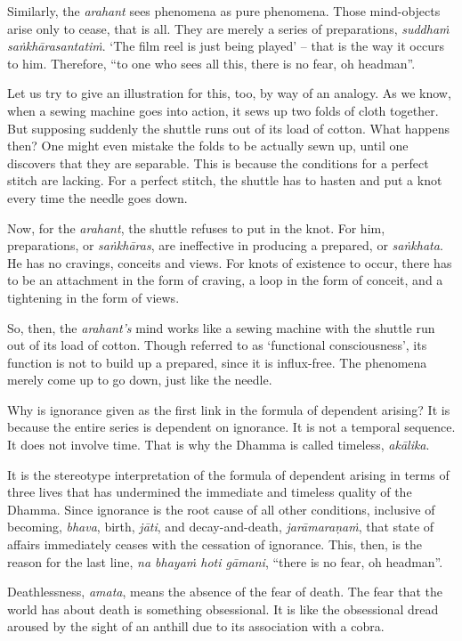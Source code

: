 Similarly, the \emph{arahant} sees phenomena as pure phenomena. Those mind-objects arise only to cease, that is all. They are merely a series of preparations, \emph{suddhaṁ saṅkhārasantatiṁ}. `The film reel is just being played' -- that is the way it occurs to him. Therefore, ``to one who sees all this, there is no fear, oh headman''.

Let us try to give an illustration for this, too, by way of an analogy. As we know, when a sewing machine goes into action, it sews up two folds of cloth together. But supposing suddenly the shuttle runs out of its load of cotton. What happens then? One might even mistake the folds to be actually sewn up, until one discovers that they are separable. This is because the conditions for a perfect stitch are lacking. For a perfect stitch, the shuttle has to hasten and put a knot every time the needle goes down.

Now, for the \emph{arahant}, the shuttle refuses to put in the knot. For him, preparations, or \emph{saṅkhāras}, are ineffective in producing a prepared, or \emph{saṅkhata}. He has no cravings, conceits and views. For knots of existence to occur, there has to be an attachment in the form of craving, a loop in the form of conceit, and a tightening in the form of views.

So, then, the \emph{arahant's} mind works like a sewing machine with the shuttle run out of its load of cotton. Though referred to as `functional consciousness', its function is not to build up a prepared, since it is influx-free. The phenomena merely come up to go down, just like the needle.

Why is ignorance given as the first link in the formula of dependent arising? It is because the entire series is dependent on ignorance. It is not a temporal sequence. It does not involve time. That is why the Dhamma is called timeless, \emph{akālika}.

It is the stereotype interpretation of the formula of dependent arising in terms of three lives that has undermined the immediate and timeless quality of the Dhamma. Since ignorance is the root cause of all other conditions, inclusive of becoming, \emph{bhava}, birth, \emph{jāti}, and decay-and-death, \emph{jarāmaraṇaṁ}, that state of affairs immediately ceases with the cessation of ignorance. This, then, is the reason for the last line, \emph{na bhayaṁ hoti gāmani}, ``there is no fear, oh headman''.

Deathlessness, \emph{amata}, means the absence of the fear of death. The fear that the world has about death is something obsessional. It is like the obsessional dread aroused by the sight of an anthill due to its association with a cobra.

